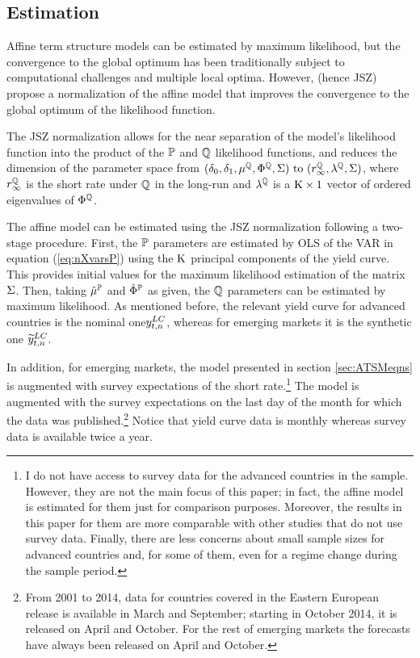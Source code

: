 {\subsection{Estimation} \label{sec:Estimation}
\iftoggle{toclinks}{\gototoc}{} %
Affine term structure models can be estimated by maximum likelihood, but the convergence to the global optimum has been traditionally subject to computational challenges and multiple local optima. However, \citet*{JSZ:2011} (hence JSZ) propose a normalization of the affine model that improves the convergence to the global optimum of the likelihood function.

The JSZ normalization allows for the near separation of the model's likelihood function into the product of the $\mathbb{P}$ and $\mathbb{Q}$ likelihood functions, and reduces the dimension of the parameter space from \((\deltazero, \deltaone, \XmuQ, \XPhiQ, \XSigma)$ to $(r^{\Qmeasure}_{\infty}, \lambda^{\Qmeasure},\XSigma)\), where \(r^{\mathbb{Q}}_{\infty}\) is the short rate under \(\mathbb{Q}\) in the long-run and \(\lambda^{\mathbb{Q}}\) is a \(\mathrm{K} \times 1\) vector of ordered eigenvalues of \(\Phi^{\mathbb{Q}}\).

The affine model can be estimated using the JSZ normalization following a two-stage procedure. 
First, the \(\mathbb{P}\) parameters are estimated by OLS of the VAR in equation (\ref{eq:nXvarsP}) using the \(\mathrm{K}\) principal components of the yield curve. This provides initial values for the maximum likelihood estimation of the matrix $\Sigma$. Then, taking \(\hat{\mu}^{\mathbb{P}}\) and \(\hat{\Phi}^{\mathbb{P}}\) as given, the \(\mathbb{Q}\) parameters can be estimated by maximum likelihood. 
As mentioned before, the relevant yield curve for advanced countries is the nominal one\(y_{t,n} ^{LC}\), whereas for emerging markets it is the synthetic one \(\widetilde{y}_{t,n} ^{LC}\).

In addition, for emerging markets, the model presented in section \ref{sec:ATSMeqns} is augmented with survey expectations of the short rate.\footnote{ I do not have access to survey data for the advanced countries in the sample. However, they are not the main focus of this paper; in fact, the affine model is estimated for them just for comparison purposes. Moreover, the results in this paper for them are more comparable with other studies that do not use survey data. Finally, there are less concerns about small sample sizes for advanced countries and, for some of them, even for a regime change during the sample period.} 
The model is augmented with the survey expectations on the last day of the month for which the data was published.\footnote{ From 2001 to 2014, data for countries covered in the Eastern European release is available in March and September; starting in October 2014, it is released on April and October. For the rest of emerging markets the forecasts have always been released on April and October.}
Notice that yield curve data is monthly whereas survey data is available twice a year.

}
